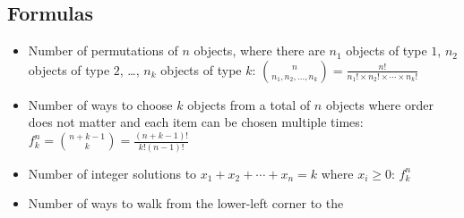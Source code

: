 \documentclass[9pt,a4paper,twocolumn,landscape,oneside]{amsart}
\newif\ifverbose
\begin{document}
    \subsection{Formulas}
        \begin{itemize}[leftmargin=*]
            \ifverbose
            \item Number of ways to choose $k$ objects from a total of $n$
                objects where order matters and each item can only be chosen
                once: $P^n_k = \frac{n!}{(n-k)!}$
            \fi
            \ifverbose
            \item Number of ways to choose $k$ objects from a total of $n$
                objects where order matters and each item can be chosen
                multiple times: $n^k$
            \fi
            \item Number of permutations of $n$ objects, where there are $n_1$
                objects of type $1$, $n_2$ objects of type $2$, \ldots, $n_k$
                objects of type $k$: $\binom{n}{n_1,n_2,\ldots,n_k} =
                \frac{n!}{n_1! \times n_2! \times \cdots \times n_k!}$
            \ifverbose
            \item Number of ways to choose $k$ objects from a total of $n$
                objects where order does not matter and each item can only be
                chosen once: \\ $\binom{n}{k} = \binom{n-1}{k-1} + \binom{n-1}k
                = \binom{n}{n-k} = \prod_{i=1}^k \frac{n-(k-i)}{i} =
                \frac{n!}{k!(n-k)!}, \binom n0 = 1, \binom 0k = 0$
            \fi
            \item Number of ways to choose $k$ objects from a total of $n$
                objects where order does not matter and each item can be chosen
                multiple times: $f^n_k = \binom{n+k-1}{k} =
                \frac{(n+k-1)!}{k!(n-1)!}$
            \item Number of integer solutions to $x_1 + x_2 + \cdots + x_n = k$
                where $x_i \geq 0$: $f^n_k$
            \ifverbose
            \item Number of subsets of a set with $n$ elements: $2^n$
            \fi
            \ifverbose
            \item $|A \cup B| = |A| + |B| - |A \cap B|$
            \item $|A \cup B \cup C| = |A| + |B| + |C| - |A \cap B| - |A \cap
                C| - |B \cap C| + |A \cap B \cap C|$
            \fi
            \ifverbose
            \item Number of ways to walk from the lower-left corner to the

\end{itemize}
\end{document}
